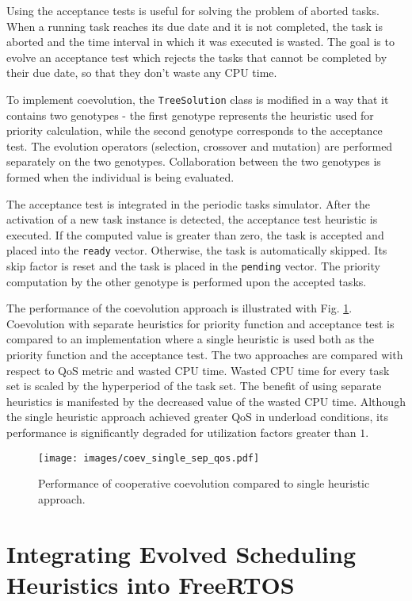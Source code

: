 Using the acceptance tests is useful for solving the problem of aborted tasks.
When a running task reaches its due date and it is not completed, the task is aborted and the time interval
in which it was executed is wasted.
The goal is to evolve an acceptance test which rejects the tasks that cannot be completed by their due date, so that they don't waste any CPU time.

To implement coevolution, the \texttt{TreeSolution} class is modified in a way that it contains two genotypes - the first genotype represents the heuristic used for priority calculation, while the second genotype corresponds to the acceptance test. 
The evolution operators (selection, crossover and mutation) are performed separately on the two genotypes.
Collaboration between the two genotypes is formed when the individual is being evaluated.

The acceptance test is integrated in the periodic tasks simulator.
After the activation of a new task instance is detected, the acceptance test heuristic is executed.
If the computed value is greater than zero, the task is accepted and placed into the \texttt{ready} vector.
Otherwise, the task is automatically skipped. 
Its skip factor is reset and the task is placed in the \texttt{pending} vector.
The priority computation by the other genotype is performed upon the accepted tasks.

The performance of the coevolution approach is illustrated with Fig. \ref{coev_single_sep}.
Coevolution with separate heuristics for priority function and acceptance test is compared to an implementation where a single heuristic is used both as the priority function and the acceptance test.
The two approaches are compared with respect to QoS metric and wasted CPU time.
Wasted CPU time for every task set is scaled by the hyperperiod of the task set.
The benefit of using separate heuristics is manifested by the decreased value of the wasted CPU time.
Although the single heuristic approach achieved greater QoS in underload conditions, its performance is significantly degraded for utilization factors greater than $1$.
\begin{figure}[ht]
    \centering
    \texttt{[image: images/coev\_single\_sep\_qos.pdf]}
    \caption{Performance of cooperative coevolution compared to single heuristic approach.}
    \label{coev_single_sep}
\end{figure}

\section{Integrating Evolved Scheduling Heuristics into FreeRTOS}
